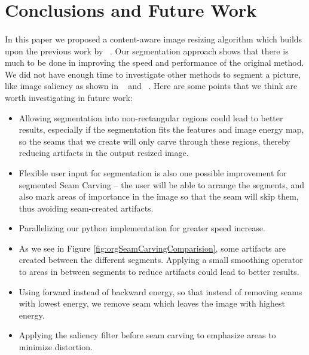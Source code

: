 \documentclass[conference]{acmsiggraph}
\begin{document}
\section{Conclusions and Future Work}

\paragraph{}
In this paper we proposed a content-aware image resizing algorithm which builds upon the previous work by ~\cite{Avidan2007}. Our segmentation approach shows that there is much to be done in improving the speed and performance of the original method. We did not have enough time to investigate other methods to segment a picture, like image saliency as shown in ~\cite{Liu2007} and ~\cite{Hasan2009}. Here are some points that we think are worth investigating in future work:

\begin{itemize}
  \item Allowing segmentation into non-rectangular regions could lead to better results, especially if the segmentation fits the features and image energy map, so the seams that we create will only carve through these regions, thereby reducing artifacts in the output resized image.
  \item Flexible user input for segmentation is also one possible improvement for segmented Seam Carving -- the user will be able to arrange the segments, and also mark areas of importance in the image so that the seam will skip them, thus avoiding seam-created artifacts. 
  \item Parallelizing our python implementation for greater speed increase.
  \item As we see in Figure \ref{fig:orgSeamCarvingComparision}, some artifacts are created between the different segments. Applying a small smoothing operator to areas in between segments to reduce artifacts could lead to better results.
  \item Using forward instead of backward energy, so that instead of removing seams with lowest energy, we remove seam which leaves the image with highest energy.
  \item Applying the saliency filter before seam carving to emphasize areas to minimize distortion.  
\end{itemize}
\end{document}
